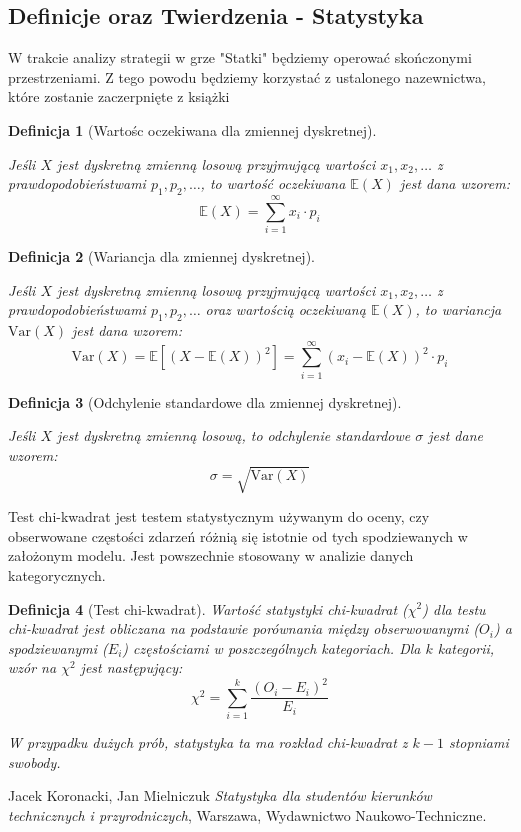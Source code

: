 \documentclass[magisterska]{pracadypl}
\newtheorem{defi}{Definicja}[section]
\begin{document}
\subsection{Definicje oraz Twierdzenia - Statystyka}

W trakcie analizy strategii w grze "Statki" będziemy operować skończonymi przestrzeniami.
Z tego powodu będziemy korzystać z ustalonego nazewnictwa, które zostanie zaczerpnięte z książki \cite{Statystyka_1} 

\begin{defi}[Wartośc oczekiwana dla zmiennej dyskretnej]\cite{Statystyka_1} 

Jeśli \( X \) jest dyskretną zmienną losową przyjmującą wartości \( x_1, x_2, \ldots \) z prawdopodobieństwami \( p_1, p_2, \ldots \), to wartość oczekiwana \( \mathbb{E}(X) \) jest dana wzorem:
\[
\mathbb{E}(X) = \sum_{i=1}^{\infty} x_i \cdot p_i
\]
\end{defi}
\begin{defi}[Wariancja dla zmiennej dyskretnej]\cite{Statystyka_1} 

Jeśli \( X \) jest dyskretną zmienną losową przyjmującą wartości \( x_1, x_2, \ldots \) z prawdopodobieństwami \( p_1, p_2, \ldots \) oraz wartością oczekiwaną \( \mathbb{E}(X) \), to wariancja \( \mathrm{Var}(X) \) jest dana wzorem:
\[
\mathrm{Var}(X) = \mathbb{E}\left[(X - \mathbb{E}(X))^2\right] = \sum_{i=1}^{\infty} (x_i - \mathbb{E}(X))^2 \cdot p_i
\]
\end{defi}
\begin{defi}[Odchylenie standardowe dla zmiennej dyskretnej]\cite{Statystyka_1} 

Jeśli \( X \) jest dyskretną zmienną losową, to odchylenie standardowe \( \sigma \) jest dane wzorem:
\[
\sigma = \sqrt{\mathrm{Var}(X)}
\]
\end{defi}

Test chi-kwadrat jest testem statystycznym używanym do oceny, czy obserwowane częstości zdarzeń różnią się istotnie od tych spodziewanych w założonym modelu. Jest powszechnie stosowany w analizie danych kategorycznych.

\begin{defi}[Test chi-kwadrat]
  Wartość statystyki chi-kwadrat (\( \chi^2 \)) dla testu chi-kwadrat jest obliczana na podstawie porównania między obserwowanymi (\( O_i \)) a spodziewanymi (\( E_i \)) częstościami w poszczególnych kategoriach. Dla \( k \) kategorii, wzór na \( \chi^2 \) jest następujący:
  \[ \chi^2 = \sum_{i=1}^{k} \frac{(O_i - E_i)^2}{E_i} \]
  
  W przypadku dużych prób, statystyka ta ma rozkład chi-kwadrat z \( k-1 \) stopniami swobody.
\end{defi}

\begin{thebibliography}{7}
Jacek Koronacki, Jan Mielniczuk 
\textit{Statystyka dla studentów kierunków technicznych i przyrodniczych},
Warszawa, Wydawnictwo Naukowo-Techniczne.
\end{thebibliography}
\end{document}
